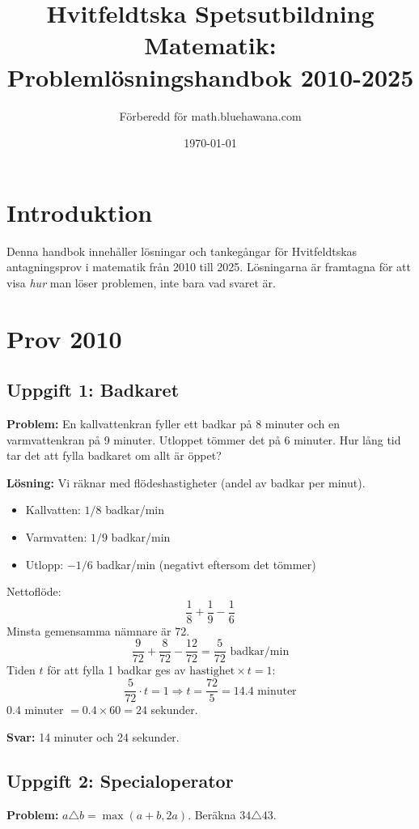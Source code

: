 \documentclass[11pt, a4paper]{article}
\title{\textbf{Hvitfeldtska Spetsutbildning Matematik: Problemlösningshandbok 2010-2025}}
\author{Förberedd för math.bluehawana.com}
\date{\today}
\begin{document}
\maketitle

\section{Introduktion}
Denna handbok innehåller lösningar och tankegångar för Hvitfeldtskas antagningsprov i matematik från 2010 till 2025.
Lösningarna är framtagna för att visa \textit{hur} man löser problemen, inte bara vad svaret är.

\tableofcontents
\newpage

\section{Prov 2010}
\subsection{Uppgift 1: Badkaret}
\textbf{Problem:} En kallvattenkran fyller ett badkar på 8 minuter och en varmvattenkran på 9 minuter. Utloppet tömmer det på 6 minuter. Hur lång tid tar det att fylla badkaret om allt är öppet?

\textbf{Lösning:}
Vi räknar med flödeshastigheter (andel av badkar per minut).
\begin{itemize}
    \item Kallvatten: $1/8$ badkar/min
    \item Varmvatten: $1/9$ badkar/min
    \item Utlopp: $-1/6$ badkar/min (negativt eftersom det tömmer)
\end{itemize}
Nettoflöde:
\[ \frac{1}{8} + \frac{1}{9} - \frac{1}{6} \]
Minsta gemensamma nämnare är 72.
\[ \frac{9}{72} + \frac{8}{72} - \frac{12}{72} = \frac{5}{72} \text{ badkar/min} \]
Tiden $t$ för att fylla 1 badkar ges av $\text{hastighet} \times t = 1$:
\[ \frac{5}{72} \cdot t = 1 \Rightarrow t = \frac{72}{5} = 14.4 \text{ minuter} \]
$0.4$ minuter $= 0.4 \times 60 = 24$ sekunder.

\textbf{Svar:} 14 minuter och 24 sekunder.

\subsection{Uppgift 2: Specialoperator}
\textbf{Problem:} $a \triangle b = \max(a+b, 2a)$. Beräkna $34 \triangle 43$.
\end{document}
